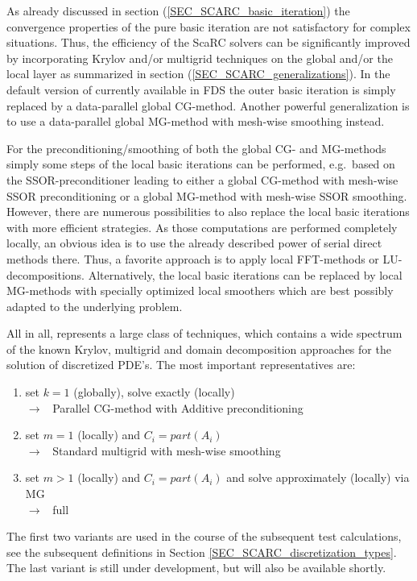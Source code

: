 As already discussed in section (\ref{SEC_SCARC_basic_iteration}) the convergence properties of the pure basic iteration are not satisfactory for complex situations. Thus, the efficiency of the ScaRC solvers can be significantly improved by incorporating Krylov and/or multigrid techniques on the global and/or the local layer as summarized in section (\ref{SEC_SCARC_generalizations}).
In the default version of \scarc{} currently available in FDS the outer basic iteration is simply replaced by a data-parallel global CG-method. Another powerful generalization is to use a data-parallel global MG-method with mesh-wise smoothing instead.

For the preconditioning/smoothing of both the global CG- and MG-methods  simply some steps of the local basic iterations can be performed, e.g.\ based on the SSOR-preconditioner leading to either a global CG-method with mesh-wise SSOR preconditioning or a global MG-method with mesh-wise SSOR smoothing.
However, there are numerous possibilities to also replace the local basic iterations with more efficient strategies. As those computations are performed completely locally, an obvious idea is to use the already described power of serial direct methods there. Thus, a favorite approach is to apply local FFT-methods or LU-decompositions. Alternatively, the local basic iterations can be replaced by local MG-methods with specially optimized local smoothers which are best possibly adapted to the underlying problem.

All in all, \scarc{} represents a large class of techniques, which contains a wide spectrum of the known Krylov, multigrid and domain decomposition approaches for the solution of discretized PDE's. The most important representatives are:
\vspace{-0.1cm}
\begin{enumerate}
\item set $k=1$ (globally), solve exactly (locally)      \\
  $\longrightarrow$ \, { Parallel CG-method with Additive \ols{} preconditioning}
\item set $m=1$ (locally) and $C_i=part(A_i)$ \\
  $\longrightarrow$ \, { Standard multigrid with mesh-wise smoothing}
\item set $m > 1$ (locally) and $C_i=part(A_i)$ and solve approximately (locally) via MG\\
  $\longrightarrow$ \,  { full \scarc{}}
\end{enumerate}
The first two variants are used in the course of the subsequent test calculations, see the subsequent definitions in Section \ref{SEC_SCARC_discretization_types}. The last variant is still under development, but will also be available shortly.

